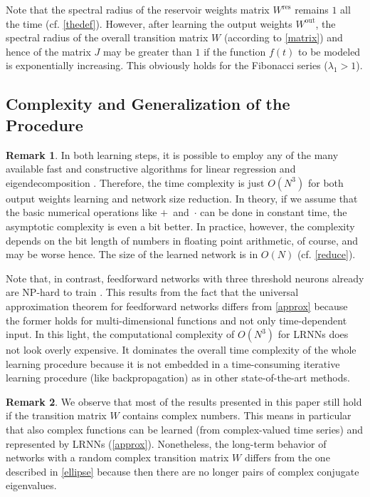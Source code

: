 \documentclass[preprint,12pt,times,authoryear]{elsarticle}%
\theoremstyle{definition}
\newtheorem{remk}{Remark}
\begin{document}
Note that the spectral radius of the reservoir weights matrix $W^\mathrm{res}$
remains $1$ all the time (cf. \cref{thedef}). However, after learning the output
weights $W^\mathrm{out}$, the spectral radius of the overall transition matrix
$W$ (according to \cref{matrix}) and hence of the matrix $J$ may
be greater than $1$ if the function $f(t)$ to be modeled is exponentially
increasing. This obviously holds for the Fibonacci series ($\lambda_1>1$).

\subsection{Complexity and Generalization of the Procedure}

\begin{remk}\label{complexity}
In both learning steps, it is possible to employ any of the many available fast
and constructive algorithms for linear regression and eigendecomposition
\citep{DDH07}. Therefore, the time complexity is just $O(N^3)$ for both output
weights learning and network size reduction. In theory, if we assume that
the basic numerical operations like $+$~and~$\cdot$ can be done in constant
time, the asymptotic complexity is even a bit better. In practice, however, the
complexity depends on the bit length of numbers in floating point arithmetic,
of course, and may be worse hence. The size of the learned network is in $O(N)$
(cf. \cref{reduce}).
\end{remk}

Note that, in contrast, feedforward networks with three threshold neurons
already are NP-hard to train \citep{BR92}. This results from the fact
that the universal approximation theorem for feedforward networks differs from
\cref{approx} because the former holds for multi-dimensional functions and
not only time-dependent input. In this light, the computational complexity of
$O(N^3)$ for LRNNs does not look overly expensive. It dominates the
overall time complexity of the whole learning procedure because it is not
embedded in a time-consuming iterative learning procedure (like backpropagation)
as in other state-of-the-art methods.

\begin{remk}
We observe that most of the results presented in this paper still
hold if the transition matrix $W$ contains complex numbers. This means in
particular that also complex functions can be learned (from complex-valued time
series) and represented by LRNNs (\cref{approx}).
Nonetheless, the long-term behavior of networks with a random complex transition
matrix $W$ differs from the one described in \cref{ellipse} because then
there are no longer pairs of complex conjugate eigenvalues.
\end{remk}
\end{document}

